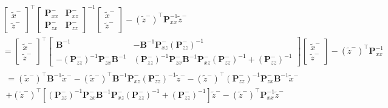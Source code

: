\documentclass[11pt]{report} %
\begin{document}
\begin{align}
&\begin{bmatrix}\widetilde{x}^{-}\\
\widetilde{z}^{-}
\end{bmatrix}^{\top}\begin{bmatrix}\mathbf{P}_{xx}^{-} & \mathbf{P}_{xz}^{-}\\
\mathbf{P}_{zx}^{-} & \mathbf{P}_{zz}^{-}
\end{bmatrix}^{-1}\begin{bmatrix}\widetilde{x}^{-}\\
\widetilde{z}^{-}
\end{bmatrix}-\left(\widetilde{z}^{-}\right)^{\top}\mathbf{P}_{xx}^{-1}\widetilde{z}^{-} \\
&= \begin{bmatrix}\widetilde{x}^{-}\\
\widetilde{z}^{-}
\end{bmatrix}^{\top}\begin{bmatrix}\mathbf{B}^{-1} & -\mathbf{B}^{-1}\mathbf{P}_{xz}^{-}\left(\mathbf{P}_{zz}^{-}\right)^{-1}\\
-\left(\mathbf{P}_{zz}^{-}\right)^{-1}\mathbf{P}_{zx}^{-}\mathbf{B}^{-1} & \left(\mathbf{P}_{zz}^{-}\right)^{-1}\mathbf{P}_{zx}^{-}\mathbf{B}^{-1}\mathbf{P}_{xz}^{-}\left(\mathbf{P}_{zz}^{-}\right)^{-1}+\left(\mathbf{P}_{zz}^{-}\right)^{-1}
\end{bmatrix}\begin{bmatrix}\widetilde{x}^{-}\\
\widetilde{z}^{-}
\end{bmatrix}-\left(\widetilde{z}^{-}\right)^{\top}\mathbf{P}_{xx}^{-1} \\
& \begin{multlined}
=\left(\widetilde{x}^{-}\right)^{\top}\mathbf{B}^{-1}\widetilde{x}^{-}-\left(\widetilde{x}^{-}\right)^{\top}\mathbf{B}^{-1}\mathbf{P}_{xz}^{-}\left(\mathbf{P}_{zz}^{-}\right)^{-1}\widetilde{z}^{-}-\left(\widetilde{z}^{-}\right)^{\top}\left(\mathbf{P}_{zz}^{-}\right)^{-1}\mathbf{P}_{zx}^{-}\mathbf{B}^{-1}\widetilde{x}^{-} \\
+\left(\widetilde{z}^{-}\right)^{\top}\left[\left(\mathbf{P}_{zz}^{-}\right)^{-1}\mathbf{P}_{zx}^{-}\mathbf{B}^{-1}\mathbf{P}_{xz}^{-}\left(\mathbf{P}_{zz}^{-}\right)^{-1}+\left(\mathbf{P}_{zz}^{-}\right)^{-1}\right]\widetilde{z}^{-}-\left(\widetilde{z}^{-}\right)^{\top}\mathbf{P}_{xx}^{-1}\widetilde{z}^{-}
\end{multlined} \\
& \begin{multlined}

\end{multlined}
\end{align}
\end{document}
